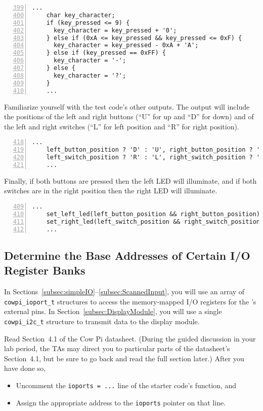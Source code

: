 \begin{lstlisting}[numberstyle=\color{gray}, numbers=left, firstnumber=399]
    ...
    char key_character;
    if (key_pressed <= 9) {
      key_character = key_pressed + '0';
    } else if (0xA <= key_pressed && key_pressed <= 0xF) {
      key_character = key_pressed - 0xA + 'A';
    } else if (key_pressed == 0xFF) {
      key_character = '-';
    } else {
      key_character = '?';
    }
    ...
\end{lstlisting}

Familiarize yourself with the test code's other outputs.
The output will include the positions of the left and right buttons (``U'' for up and ``D'' for down) and of the left and right switches (``L'' for left position and ``R'' for right position).

\begin{lstlisting}[numberstyle=\color{gray}, numbers=left, firstnumber=418]
    ...
    left_button_position ? 'D' : 'U', right_button_position ? 'D' : 'U',
    left_switch_position ? 'R' : 'L', right_switch_position ? 'R' : 'L'
    ...
\end{lstlisting}

Finally, if both buttons are pressed then the left LED will illuminate, and if both switches are in the right position then the right LED will illuminate.

\begin{lstlisting}[numberstyle=\color{gray}, numbers=left, firstnumber=409]
    ...
    set_left_led(left_button_position && right_button_position);
    set_right_led(left_switch_position && right_switch_position);
    ...
\end{lstlisting}


\subsection{Determine the Base Addresses of Certain I/O Register Banks} \label{subsec:baseAddresses}

In Sections~\ref{subsec:simpleIO}--\ref{subsec:ScannedInput}, you will use an array of \lstinline{cowpi_ioport_t} structures to access the memory-mapped I/O registers for the \developmentboard's external pins.
In Section~\ref{subsec:DisplayModule}, you will use a single \lstinline{cowpi_i2c_t} structure to transmit data to the display module.

Read Section~4.1 of the Cow Pi datasheet.
(During the guided discussion in your lab period, the TAs may direct you to particular parts of the datasheet's Section~4.1,
but be sure to go back and read the full section later.)
After you have done so,
\begin{itemize}
    \item Uncomment the \lstinline{ioports = ...} line of the starter code's  function, and
    \item Assign the appropriate address to the \lstinline{ioports} pointer on that line.
\end{itemize}

